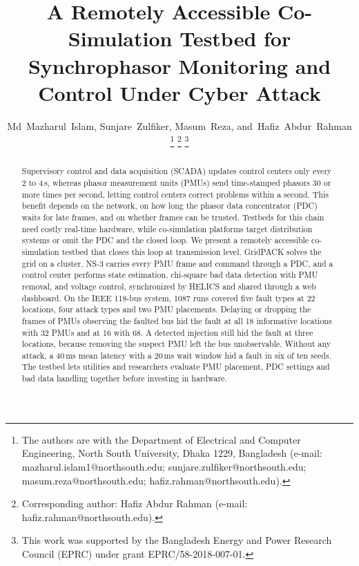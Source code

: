 \documentclass[journal]{IEEEtran}
\begin{document}
\title{A Remotely Accessible Co-Simulation Testbed for Synchrophasor Monitoring and Control Under Cyber Attack}

\author{Md~Mazharul~Islam,
        Sunjare~Zulfiker,
        Masum~Reza,
        and~Hafiz~Abdur~Rahman%
\thanks{The authors are with the Department of Electrical and Computer Engineering, North South University, Dhaka 1229, Bangladesh (e-mail: mazharul.islam1@northsouth.edu; sunjare.zulfiker@northsouth.edu; masum.reza@northsouth.edu; hafiz.rahman@northsouth.edu).}%
\thanks{Corresponding author: Hafiz Abdur Rahman (e-mail: hafiz.rahman@northsouth.edu).}%
\thanks{This work was supported by the Bangladesh Energy and Power Research Council (EPRC) under grant EPRC/58-2018-007-01.}}


\maketitle

\begin{abstract}
Supervisory control and data acquisition (SCADA) updates control centers only every 2 to 4\,s, whereas phasor measurement units (PMUs) send time-stamped phasors 30 or more times per second, letting control centers correct problems within a second. This benefit depends on the network, on how long the phasor data concentrator (PDC) waits for late frames, and on whether frames can be trusted. Testbeds for this chain need costly real-time hardware, while co-simulation platforms target distribution systems or omit the PDC and the closed loop. We present a remotely accessible co-simulation testbed that closes this loop at transmission level. GridPACK solves the grid on a cluster, NS-3 carries every PMU frame and command through a PDC, and a control center performs state estimation, chi-square bad data detection with PMU removal, and voltage control, synchronized by HELICS and shared through a web dashboard. On the IEEE 118-bus system, 1087 runs covered five fault types at 22 locations, four attack types and two PMU placements. Delaying or dropping the frames of PMUs observing the faulted bus hid the fault at all 18 informative locations with 32 PMUs and at 16 with 68. A detected injection still hid the fault at three locations, because removing the suspect PMU left the bus unobservable. Without any attack, a 40\,ms mean latency with a 20\,ms wait window hid a fault in six of ten seeds. The testbed lets utilities and researchers evaluate PMU placement, PDC settings and bad data handling together before investing in hardware.
\end{abstract}
\end{document}
